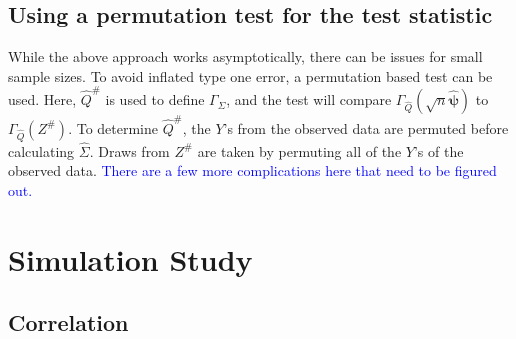 \documentclass{article}
\newcommand{\rvv}{Z}
\newcommand{\distv}{Q}
\newcommand{\Gammaf}{\Gamma_{\Sigma}}
\begin{document}
\subsection{Using a permutation test for the test statistic}
While the above approach works asymptotically, there can be issues for small sample sizes.  To avoid inflated type one error, a permutation based test can be used.  Here, $\hat{\distv}^\#$ is used to define $\Gammaf$, and the test will compare $\Gamma_{\hat{\distv}}(\sqrt{n} \hat{\boldsymbol{\psi}})$ to $\Gamma_{\hat{\distv}}(\rvv^\#)$. To determine $\hat{\distv}^\#$, the $Y$'s from the observed data are permuted before calculating $\widehat \Sigma$.  Draws from $\rvv^\#$ are taken by permuting all of the $Y$'s of the observed data.  \textcolor{blue}{There are a few more complications here that need to be figured out.}

\section{Simulation Study}
\label{sec:sim_stdy}

\subsection{Correlation}


\end{document}

